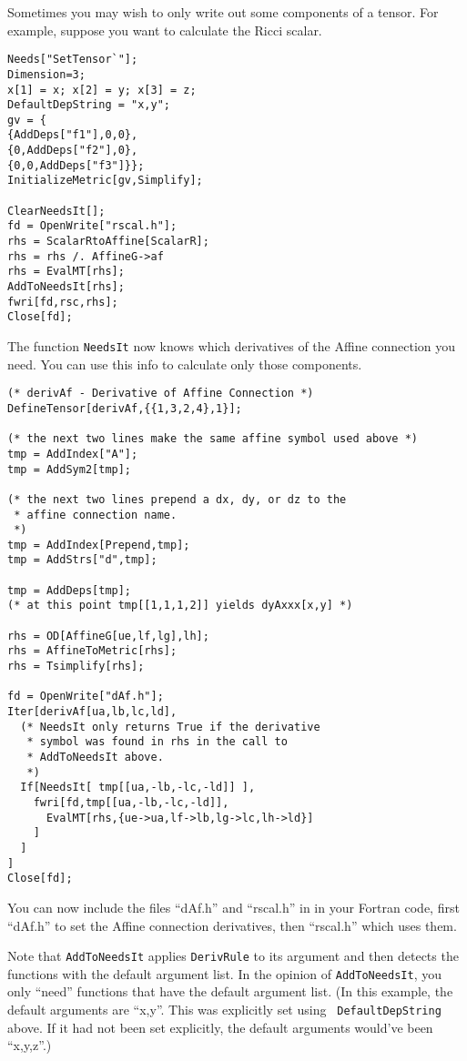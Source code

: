Sometimes you may wish to only write out some components of a tensor.
For example, suppose you want to calculate the Ricci scalar.
\begin{verbatim}
Needs["SetTensor`"];
Dimension=3;
x[1] = x; x[2] = y; x[3] = z;
DefaultDepString = "x,y";
gv = {
{AddDeps["f1"],0,0},
{0,AddDeps["f2"],0},
{0,0,AddDeps["f3"]}};
InitializeMetric[gv,Simplify];

ClearNeedsIt[];
fd = OpenWrite["rscal.h"];
rhs = ScalarRtoAffine[ScalarR];
rhs = rhs /. AffineG->af
rhs = EvalMT[rhs];
AddToNeedsIt[rhs];
fwri[fd,rsc,rhs];
Close[fd];
\end{verbatim}
The function {\tt NeedsIt} now knows which derivatives of the Affine
connection you need.  You can use this info to calculate only those
components.
\begin{verbatim}
(* derivAf - Derivative of Affine Connection *)
DefineTensor[derivAf,{{1,3,2,4},1}];

(* the next two lines make the same affine symbol used above *)
tmp = AddIndex["A"];
tmp = AddSym2[tmp];

(* the next two lines prepend a dx, dy, or dz to the
 * affine connection name.
 *)
tmp = AddIndex[Prepend,tmp];
tmp = AddStrs["d",tmp];

tmp = AddDeps[tmp];
(* at this point tmp[[1,1,1,2]] yields dyAxxx[x,y] *)

rhs = OD[AffineG[ue,lf,lg],lh];
rhs = AffineToMetric[rhs];
rhs = Tsimplify[rhs];

fd = OpenWrite["dAf.h"];
Iter[derivAf[ua,lb,lc,ld],
  (* NeedsIt only returns True if the derivative
   * symbol was found in rhs in the call to
   * AddToNeedsIt above.
   *)
  If[NeedsIt[ tmp[[ua,-lb,-lc,-ld]] ],
    fwri[fd,tmp[[ua,-lb,-lc,-ld]],
      EvalMT[rhs,{ue->ua,lf->lb,lg->lc,lh->ld}]
    ]
  ]
]
Close[fd];
\end{verbatim}
You can now include the files ``dAf.h'' and ``rscal.h'' in in your Fortran code,
first ``dAf.h'' to set the Affine connection derivatives, then ``rscal.h'' which
uses them.

Note that {\tt AddToNeedsIt} applies {\tt DerivRule} to its 
argument and then detects the functions with the default 
argument list. In the opinion of {\tt AddToNeedsIt}, you only 
``need'' functions that have the default argument list. (In this 
example, the default arguments are ``x,y''. This was explicitly set using {\tt 
DefaultDepString} above. If it had not been set explicitly, the default
arguments would've been ``x,y,z''.) 

